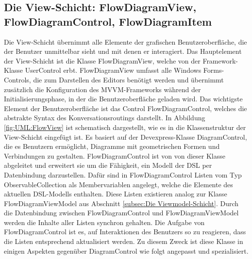 \subsection[Die View-Schicht]{Die View-Schicht: FlowDiagramView, FlowDiagramControl, FlowDiagramItem}
Die View-Schicht übernimmt alle Elemente der grafischen Benutzeroberfläche, die der Benutzer unmittelbar sieht und mit denen er interagiert. Das Hauptelement der View-Schicht ist die Klasse FlowDiagramView, welche von der Framework-Klasse UserControl erbt. FlowDiagramView umfasst alle Windows Forms-Controls, die zum Darstellen des Editors benötigt werden und übernimmt zusätzlich die Konfiguration des MVVM-Frameworks während der Initialisierungsphase, in der die Benutzeroberfläche geladen wird.
\newline  
Das wichtigste Element der Benutzeroberfläche ist das Control FlowDiagramControl, welches  die abstrakte Syntax des Konversationsroutings darstellt. In Abbildung \ref{fig:UML:FlowView} ist schematisch dargestellt, wie es in die Klassenstruktur der View-Schicht eingefügt ist. Es basiert auf der Devexpress-Klasse DiagramControl, die es Benutzern ermöglicht, Diagramme mit geometrischen Formen und Verbindungen zu gestalten. FlowDiagramControl ist von von dieser Klasse abgeleitet und erweitert sie um die Fähigkeit, ein Modell der DSL per Datenbindung darzustellen. Dafür sind in FlowDiagramControl Listen vom Typ ObservableCollection als Membervariablen angelegt, welche die Elemente des aktuellen DSL-Modells enthalten. Diese Listen existieren analog zur Klasse FlowDiagramViewModel aus Abschnitt \ref{subsec:Die Viewmodel-Schicht}. Durch die Datenbindung zwischen FlowDiagramControl und FlowDiagramViewModel werden die Inhalte aller Listen synchron gehalten. Die Aufgabe von FlowDiagramControl ist es, auf Interaktionen des Benutzers so zu reagieren, dass die Listen entsprechend aktualisiert werden. Zu diesem Zweck ist diese Klasse in einigen Aspekten gegenüber DiagramControl wie folgt angepasst und spezialisiert.
\newline
